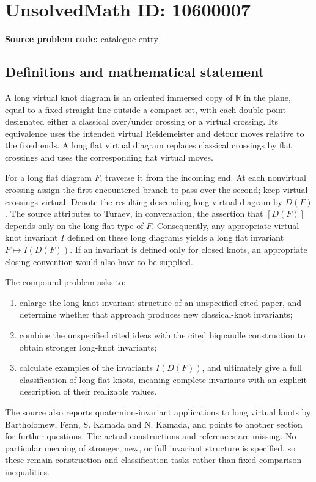 \documentclass[11pt]{article}
\newcommand{\R}{\mathbb{R}}
\begin{document}
\section*{UnsolvedMath ID: 10600007}
\textbf{Source problem code:} catalogue entry
\subsection{Definitions and mathematical statement}
A long virtual knot diagram is an oriented immersed copy of \(\R\) in the plane, equal to a fixed straight line outside a compact set, with each double point designated either a classical over/under crossing or a virtual crossing. Its equivalence uses the intended virtual Reidemeister and detour moves relative to the fixed ends. A long flat virtual diagram replaces classical crossings by flat crossings and uses the corresponding flat virtual moves.

For a long flat diagram \(F\), traverse it from the incoming end. At each nonvirtual crossing assign the first encountered branch to pass over the second; keep virtual crossings virtual. Denote the resulting descending long virtual diagram by \(D(F)\). The source attributes to Turaev, in conversation, the assertion that \([D(F)]\) depends only on the long flat type of \(F\). Consequently, any appropriate virtual-knot invariant \(I\) defined on these long diagrams yields a long flat invariant \(F\mapsto I(D(F))\). If an invariant is defined only for closed knots, an appropriate closing convention would also have to be supplied.

The compound problem asks to:
\begin{enumerate}
\item enlarge the long-knot invariant structure of an unspecified cited paper, and determine whether that approach produces new classical-knot invariants;
\item combine the unspecified cited ideas with the cited biquandle construction to obtain stronger long-knot invariants;
\item calculate examples of the invariants \(I(D(F))\), and ultimately give a full classification of long flat knots, meaning complete invariants with an explicit description of their realizable values.
\end{enumerate}
The source also reports quaternion-invariant applications to long virtual knots by Bartholomew, Fenn, S. Kamada and N. Kamada, and points to another section for further questions. The actual constructions and references are missing. No particular meaning of stronger, new, or full invariant structure is specified, so these remain construction and classification tasks rather than fixed comparison inequalities.
\end{document}
